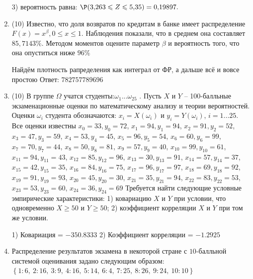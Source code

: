 \documentclass[a4paper,14pt]{article}
\begin{document}
\begin{enumerate}
3) вероятность равна:
$
\P(3,\!263\leqslant Z\leqslant 5,\!35)=
0,\!19897.
$


\item


(10) Известно, что доля возвратов по кредитам в банке имеет распределение $F(x) = x ^{\beta}, 0 \leqslant x \leqslant 1$.
Наблюдения показали, что в среднем она составляет $85,7143\%$. Методом моментов оцените параметр $\beta$ и
вероятность того, что она опуститься ниже $96\%$




Найдём плотность рапределения как интеграл от ФР, а дальше всё и вовсе простою Ответ: $782757789696$


\item


(10) В группе $\Omega$ учатся студенты:$\omega _{1}...\omega _{25}$ . Пусть $X$ и $Y$ – 100-балльные экзаменационные оценки по
математическому анализу и теории вероятностей. Оценки $\omega _{i}$ студента обозначаются: $x _{i} = X(\omega _{i})$ и $y _{i} = Y(\omega _{i})$, $i = 1...25$. Все оценки известны
$x _{0} = 33, y _{0} = 72$, $x _{1} = 94, y _{1} = 94$, $x _{2} = 91, y _{2} = 52$, $x _{3} = 47, y _{3} = 59$, $x _{4} = 53, y _{4} = 45$, $x _{5} = 96, y _{5} = 54$, $x _{6} = 60, y _{6} = 99$, $x _{7} = 70, y _{7} = 44$, $x _{8} = 50, y _{8} = 81$, $x _{9} = 57, y _{9} = 40$, $x _{10} = 99, y _{10} = 61$, $x _{11} = 94, y _{11} = 43$, $x _{12} = 85, y _{12} = 96$, $x _{13} = 30, y _{13} = 91$, $x _{14} = 57, y _{14} = 37$, $x _{15} = 42, y _{15} = 35$, $x _{16} = 84, y _{16} = 75$, $x _{17} = 96, y _{17} = 97$, $x _{18} = 69, y _{18} = 92$, $x _{19} = 91, y _{19} = 93$, $x _{20} = 45, y _{20} = 30$, $x _{21} = 35, y _{21} = 94$, $x _{22} = 83, y _{22} = 53$, $x _{23} = 53, y _{23} = 60$, $x _{24} = 36, y _{24} = 69$
Требуется
найти следующие условные эмпирические характеристики: 1) ковариацию $X$ и $Y$ при условии, что одновременно $X \geqslant 50$
 и $Y \geqslant 50$; 2) коэффициент корреляции $X$ и $Y$ при том же условии.




1) Ковариация = $-350.8333$
2) Коэффициент корреляции = $-1.2925$


\item

    
    	Распределение результатов экзамена в некоторой стране с $10$-балльной системой оценивания задано следующим образом:
    	$\left\{ 1 : 6, \  2 : 16, \  3 : 9, \  4 : 16, \  5 : 14, \  6 : 4, \  7 : 25, \  8 : 26, \  9 : 24, \  10 : 10\right\}$


\end{enumerate}
\end{document}
